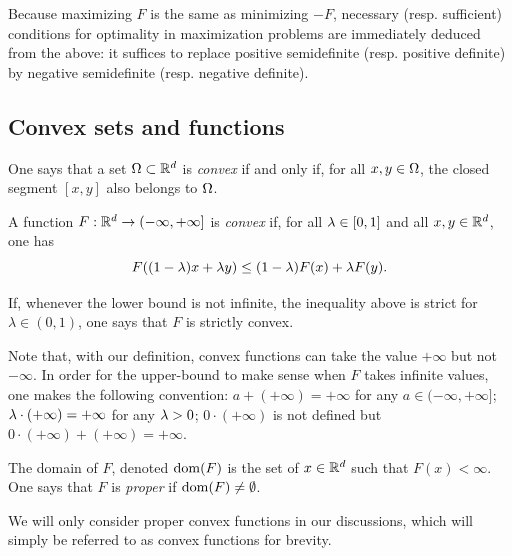 Because maximizing $F$ is the same as minimizing $-F$, necessary (resp. sufficient) conditions for optimality in maximization problems are immediately deduced from the above: it suffices to replace positive semidefinite (resp. positive definite) by negative semidefinite (resp. negative definite).

\subsection{Convex sets and functions}

\begin{definition}
\label{def:convex.set}
One says that a set $\Omega\subset {\mathbb{R}}^d$ is {\em convex} if and only if, for all $x,y\in \Omega$, the closed segment $[x,y]$  also belongs to $\Omega$. 

A function $F: {\mathbb{R}}^d \to (-\infty, +\infty]$ is {\em convex} if, for all $\lambda\in [0, 1]$ and all $x,y\in {\mathbb{R}}^d$, one has
\begin{equation}
\label{eq:conv.1}
F((1-\lambda)x + \lambda y) \leq (1-\lambda) F(x) + \lambda F(y). 
\end{equation}

If, whenever the lower bound is not infinite,  the inequality above is strict for $\lambda\in (0,1)$, one says that $F$ is strictly convex. 
\end{definition}

Note that, with our definition, convex functions can take the value  $+\infty$ but not  $-\infty$. In order for the upper-bound to make sense when $F$ takes infinite values, one makes the following convention: $a + (+\infty) = +\infty$ for any $a\in (-\infty, +\infty]$; $\lambda\cdot (+\infty) = +\infty$ for any $\lambda>0$; $0\cdot (+\infty)$ is not defined but $0\cdot (+\infty) + (+\infty) = +\infty$.

\begin{definition}
\label{def:domain}
The domain of $F$, denoted $\mathrm{dom}(F)$ is the set of $x\in {\mathbb{R}}^d$ such that $F(x) < \infty$. One says that  $F$ is {\em proper} if $\mathrm{dom}(F)\neq \emptyset$. 

We will only consider proper convex functions in our discussions, which will simply be referred to as convex functions for brevity.
\end{definition}

